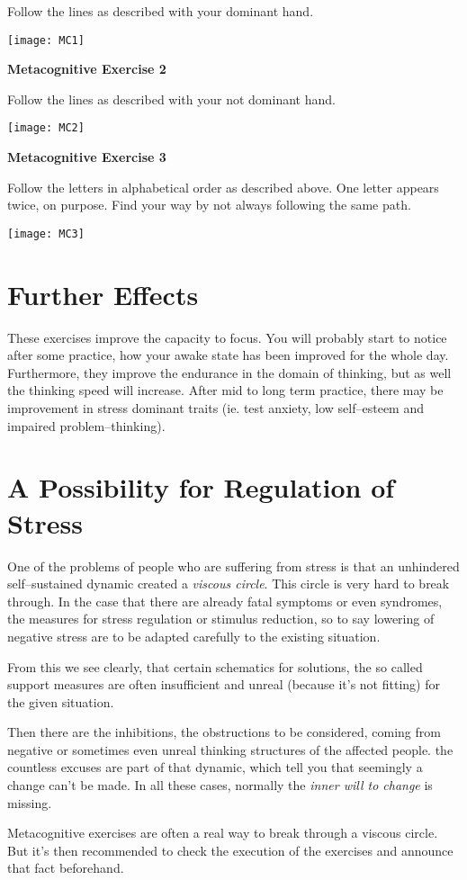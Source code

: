 \documentclass[../main.tex]{subfiles}
\begin{document}
\noindent Follow the lines as described with your dominant hand.

\noindent \texttt{[image: MC1]}

\newpage

\noindent \textbf{Metacognitive Exercise 2}

\noindent Follow the lines as described with your not dominant hand.

\noindent \texttt{[image: MC2]}

\newpage


\noindent \textbf{Metacognitive Exercise 3}

\noindent Follow the letters in alphabetical order as described above. One letter appears twice, on purpose. Find your way by not always following the same path.

\noindent \texttt{[image: MC3]}

\newpage

\section{Further Effects}

These exercises improve the capacity to {focus}. You will probably start to notice after some practice, how your awake state has been improved for the whole day.
Furthermore, they improve the endurance in the domain of thinking, but as well the {thinking speed will increase}.
After mid to long term practice, there may be improvement in {stress dominant traits} (ie. test anxiety, low self--esteem and impaired problem--thinking).

\section{A Possibility for Regulation of Stress}


One of the problems of people who are suffering from stress is that an unhindered self--sustained dynamic created a \emph{viscous circle}.
This circle is very hard to break through.
In the case that there are already fatal symptoms or even syndromes, the measures for stress regulation or stimulus reduction, so to say lowering of negative stress are to be adapted carefully to the existing situation.

From this we see clearly, that certain schematics for solutions, the so called support measures %
are often insufficient and unreal (because it's not fitting) for the given situation.

Then there are the inhibitions, the {obstructions} to be considered, coming from negative or sometimes even unreal thinking structures of the affected people. the countless  excuses are part of that dynamic, which tell you that seemingly a change can't be made. In all these cases, normally the \emph{inner will to change} is missing.

Metacognitive exercises are often a real way to break through a {viscous circle}. But it's then recommended to check the execution of the exercises and announce that fact beforehand. 
\end{document}
